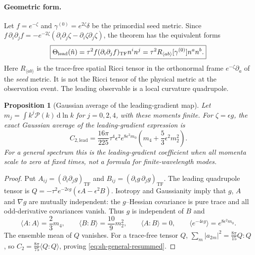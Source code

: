 \documentclass[11pt]{article}
\newtheorem{proposition}[theorem]{Proposition}
\theoremstyle{definition}
\theoremstyle{remark}
\newcommand{\eps}{\epsilon}
\newcommand{\nh}{\hat n}
\newcommand{\dd}{\mathrm{d}}
\newcommand{\ens}[1]{\langle #1\rangle}
\newcommand{\TF}{\operatorname{TF}}
\begin{document}
\paragraph{Geometric form.}
Let $f=e^{-\zeta}$ and $\gamma^{(0)}=e^{2\zeta}\delta$ be the primordial seed metric. Since
$f\,\partial_i\partial_jf=-e^{-2\zeta}(\partial_i\partial_j\zeta-
\partial_i\zeta\partial_j\zeta)$, the theorem has the equivalent forms
\begin{equation}\label{eq:curvature-quadrupole}
\boxed{\displaystyle
\Theta_{\rm lead}(\nh)=\tau^2 f(\partial_i\partial_jf)_{\TF}n^in^j
=\tau^2 R_{\langle ab\rangle}[\gamma^{(0)}]n^an^b.}
\end{equation}
Here $R_{\langle ab\rangle}$ is the trace-free spatial Ricci tensor in the orthonormal frame
$e^{-\zeta}\partial_a$ of the \emph{seed} metric. It is not the Ricci tensor of the physical
metric at the observation event. The leading observable is a local curvature quadrupole.

\begin{proposition}[Gaussian average of the leading-gradient map]\label{prop:sh-resummed}
Let $m_j=\int k^j\mathcal P(k)\,\dd\ln k$ for $j=0,2,4$, with these moments finite.
For $\zeta=\eps g$, the exact Gaussian average of the leading-gradient expression is
\begin{equation}\label{eq:sh-general-resummed}
\boxed{\displaystyle
C_{2,\mathrm{lead}}=
\frac{16\pi}{225}\tau^4\eps^2 e^{8\eps^2m_0}
\left(m_4+\frac53\eps^2m_2^2\right).}
\end{equation}
For a general spectrum this is the leading-gradient coefficient when all momenta scale to
zero at fixed times, not a formula for finite-wavelength modes.
\end{proposition}
\begin{proof}
Put $A_{ij}=(\partial_i\partial_jg)_{\TF}$ and
$B_{ij}=(\partial_i g\,\partial_jg)_{\TF}$. The leading quadrupole tensor is
$Q=-\tau^2e^{-2\eps g}(\eps A-\eps^2B)$. Isotropy and Gaussianity imply that $g$, $A$ and
$\nabla g$ are mutually independent: the $g$--Hessian covariance is pure trace and all
odd-derivative covariances vanish. Thus $g$ is independent of $B$ and
\[
\ens{A:A}=\frac23m_4,\qquad
\ens{B:B}=\frac{10}{9}m_2^2,\qquad
\ens{A:B}=0,\qquad
\ens{e^{-4\eps g}}=e^{8\eps^2m_0}.
\]
The ensemble mean of $Q$ vanishes. For a trace-free tensor $Q$,
$\sum_m|a_{2m}|^2=\frac{8\pi}{15}Q:Q$, so
$C_2=\frac{8\pi}{75}\ens{Q:Q}$, proving \eqref{eq:sh-general-resummed}.
\end{proof}
\end{document}
